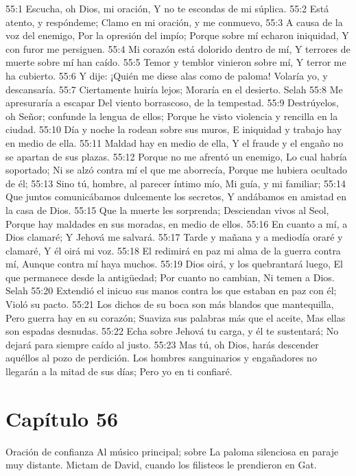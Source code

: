 55:1 Escucha, oh Dios, mi oración, 
Y no te escondas de mi súplica. 
55:2 Está atento, y respóndeme; 
Clamo en mi oración, y me conmuevo, 
55:3 A causa de la voz del enemigo, 
Por la opresión del impío; 
Porque sobre mí echaron iniquidad, 
Y con furor me persiguen. 
55:4 Mi corazón está dolorido dentro de mí, 
Y terrores de muerte sobre mí han caído. 
55:5 Temor y temblor vinieron sobre mí, 
Y terror me ha cubierto. 
55:6 Y dije: ¡Quién me diese alas como de paloma! 
Volaría yo, y descansaría. 
55:7 Ciertamente huiría lejos; 
Moraría en el desierto. Selah 
55:8 Me apresuraría a escapar 
Del viento borrascoso, de la tempestad. 
55:9 Destrúyelos, oh Señor; confunde la lengua de ellos; 
Porque he visto violencia y rencilla en la ciudad. 
55:10 Día y noche la rodean sobre sus muros, 
E iniquidad y trabajo hay en medio de ella. 
55:11 Maldad hay en medio de ella, 
Y el fraude y el engaño no se apartan de sus plazas. 
55:12 Porque no me afrentó un enemigo, 
Lo cual habría soportado; 
Ni se alzó contra mí el que me aborrecía, 
Porque me hubiera ocultado de él; 
55:13 Sino tú, hombre, al parecer íntimo mío, 
Mi guía, y mi familiar; 
55:14 Que juntos comunicábamos dulcemente los secretos, 
Y andábamos en amistad en la casa de Dios. 
55:15 Que la muerte les sorprenda; 
Desciendan vivos al Seol, 
Porque hay maldades en sus moradas, en medio de ellos. 
55:16 En cuanto a mí, a Dios clamaré; 
Y Jehová me salvará. 
55:17 Tarde y mañana y a mediodía oraré y clamaré, 
Y él oirá mi voz. 
55:18 El redimirá en paz mi alma de la guerra contra mí, 
Aunque contra mí haya muchos. 
55:19 Dios oirá, y los quebrantará luego, 
El que permanece desde la antigüedad; 
Por cuanto no cambian, 
Ni temen a Dios. Selah 
55:20 Extendió el inicuo sus manos contra los que estaban en paz con él; 
Violó su pacto. 
55:21 Los dichos de su boca son más blandos que mantequilla, 
Pero guerra hay en su corazón; 
Suaviza sus palabras más que el aceite, 
Mas ellas son espadas desnudas. 
55:22 Echa sobre Jehová tu carga, y él te sustentará; 
No dejará para siempre caído al justo. 
55:23 Mas tú, oh Dios, harás descender aquéllos al pozo de perdición. 
Los hombres sanguinarios y engañadores no llegarán a la mitad de sus días; 
Pero yo en ti confiaré. 
\section*{Capítulo 56}
Oración de confianza 
Al músico principal; sobre La paloma silenciosa en paraje muy distante. Mictam de David, cuando los filisteos le prendieron en Gat.   
 
